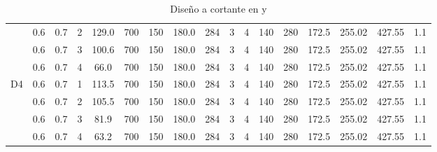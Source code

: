 \begin{table}[H]
{\begin{tabular}{|c|c|c|r|c|c|c|c|c|c|c|c|c|c|c|c|c|}
\cline{2-17}          & 0.6   & 0.7   & 2     & 129.0 & 700   & 150   & 180.0 & 284   & 3     & 4     & 140   & 280   & 172.5 & 255.02 & 427.55 & 1.1 \bigstrut\\
\cline{2-17}          & 0.6   & 0.7   & 3     & 100.6 & 700   & 150   & 180.0 & 284   & 3     & 4     & 140   & 280   & 172.5 & 255.02 & 427.55 & 1.1 \bigstrut\\
\cline{2-17}          & 0.6   & 0.7   & 4     & 66.0  & 700   & 150   & 180.0 & 284   & 3     & 4     & 140   & 280   & 172.5 & 255.02 & 427.55 & 1.1 \bigstrut\\
    \hline
    \multirow{4}[8]{*}{D4} & 0.6   & 0.7   & 1     & 113.5 & 700   & 150   & 180.0 & 284   & 3     & 4     & 140   & 280   & 172.5 & 255.02 & 427.55 & 1.1 \bigstrut\\
\cline{2-17}          & 0.6   & 0.7   & 2     & 105.5 & 700   & 150   & 180.0 & 284   & 3     & 4     & 140   & 280   & 172.5 & 255.02 & 427.55 & 1.1 \bigstrut\\
\cline{2-17}          & 0.6   & 0.7   & 3     & 81.9  & 700   & 150   & 180.0 & 284   & 3     & 4     & 140   & 280   & 172.5 & 255.02 & 427.55 & 1.1 \bigstrut\\
\cline{2-17}          & 0.6   & 0.7   & 4     & 63.2  & 700   & 150   & 180.0 & 284   & 3     & 4     & 140   & 280   & 172.5 & 255.02 & 427.55 & 1.1 \bigstrut\\
    \hline
    \end{tabular}}%
  \caption{Diseño a cortante en y}
  \label{tab:Cortantey}%
\end{table}%


